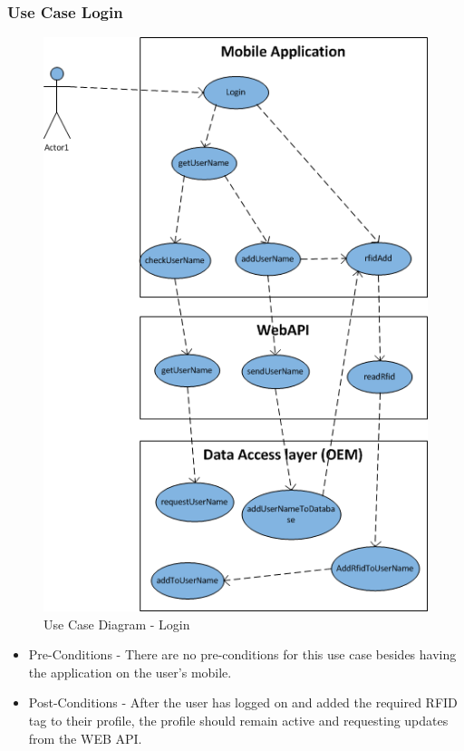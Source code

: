\documentclass[11pt,titlepage]{article} %
\begin{document}
	\subsubsection{Use Case Login}
\begin{figure}[H]
\centering
\includegraphics[scale = 0.8]{UseCaseLogin.png}
\caption{Use Case Diagram - Login}
\end{figure}
\begin{itemize}
\item Pre-Conditions - There are no pre-conditions for this use case besides having the application on the user's mobile.
\item Post-Conditions - After the user has logged on and added the required RFID tag to their profile, the profile should remain active and requesting updates from the WEB API.
\end{itemize}
	
\end{document}
